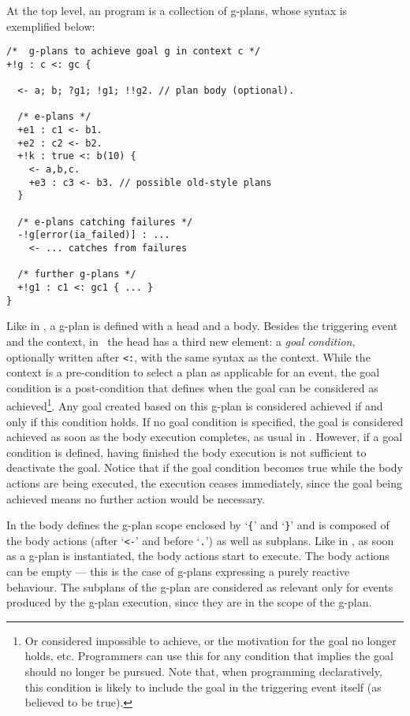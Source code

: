 At the top level, an {\aser} program is a collection of g-plans, whose
syntax is exemplified below:
%
%
{\small
\begin{verbatim}
/*  g-plans to achieve goal g in context c */
+!g : c <: gc { 

  <- a; b; ?g1; !g1; !!g2. // plan body (optional).

  /* e-plans */
  +e1 : c1 <- b1.	
  +e2 : c2 <- b2.
  +!k : true <: b(10) {
    <- a,b,c.
    +e3 : c3 <- b3. // possible old-style plans
  }	
  
  /* e-plans catching failures */
  -!g[error(ia_failed)] : ...
    <- ... catches from failures 

  /* further g-plans */
  +!g1 : c1 <: gc1 { ... }
}
\end{verbatim}}

Like in {\asl}, a g-plan is defined with a head and a body.
%
Besides the triggering event and the context, in \aser\ the head has a
third new element: a \emph{goal condition}, optionally written after
\texttt{<:}, with the same syntax as the context. While the context is
a pre-condition to select a plan as applicable for an event, the goal
condition is a post-condition that defines when the goal can be
considered as achieved\footnote{Or considered impossible to achieve,
  or the motivation for the goal no longer holds, etc. Programmers can
  use this for any condition that implies the goal should no longer be
  pursued. Note that, when programming declaratively, this condition
  is likely to include the goal in the triggering event itself (as
  believed to be true).}. Any goal created based on this g-plan is
considered achieved if and only if
this condition holds. If no goal condition is specified, the goal is
considered achieved as soon as the body execution completes, as usual
in \asl. However, if a goal condition is defined, having finished the
body execution is not sufficient to deactivate the goal. Notice that
if the goal condition becomes true while the body actions are being
executed, the execution ceases immediately, since the goal being
achieved means no further action would be necessary.

In {\aser} the body defines the g-plan scope enclosed by `\texttt{\{}'
and `\texttt{\}}' and is composed of the body actions (after `\texttt{<-}'
and before `\texttt{.}')  as well as subplans.
%
Like in {\asl}, as soon as a g-plan is instantiated, the body actions
start to execute. The body actions can be empty --- this is the case
of g-plans expressing a purely reactive behaviour.
%
The subplans of the g-plan are considered as relevant only for events
produced by the g-plan execution, since they are in the scope of the g-plan.

